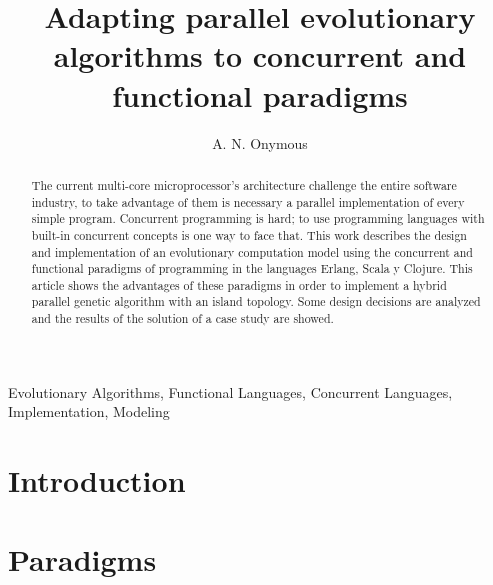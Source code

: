 \documentclass[a4paper]{llncs}
\newcommand{\keywords}[1]{\par\addvspace\baselineskip
\noindent\keywordname\enspace\ignorespaces#1}
\begin{document}
\title{Adapting parallel evolutionary algorithms to concurrent and functional paradigms}

\author{A. N. Onymous}






\maketitle

\begin{abstract}
The current multi-core microprocessor's architecture challenge the entire software industry, to take advantage of them is necessary a parallel implementation of every simple program. Concurrent programming is hard; to use programming languages with built-in concurrent concepts is one way to face that. This work describes the design and implementation of an evolutionary computation model using the concurrent and functional paradigms of programming in the languages Erlang, Scala y Clojure. This article shows the advantages of these paradigms in order to implement a hybrid parallel genetic algorithm with an island topology. Some design decisions are analyzed and the results of the solution of a case study are showed.
\end{abstract}

\keywords{Evolutionary Algorithms, Functional Languages, Concurrent Languages, Implementation, Modeling}


\section{Introduction}
\label{sec:intro}
    

\section{Paradigms}
\label{sec:paradigmas}
\end{document}
